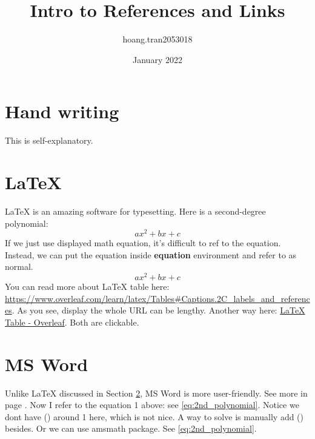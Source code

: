 \documentclass{article}
\title{Intro to References and Links}
\author{hoang.tran2053018 }
\date{January 2022}
\begin{document}
\maketitle
\section{Hand writing}
This is self-explanatory.

\section{LaTeX}\label{sec:latex-section} %
LaTeX is an amazing software for typesetting. Here is a second-degree polynomial: \[ax^{2}+bx+c\]
If we just use displayed math equation, it's difficult to ref to the equation. Instead, we can put the equation inside \textbf{equation} environment and refer to as normal.
\begin{equation}
\label{eq:2nd_polynomial} %
    ax^{2}+bx+c
\end{equation}
You can read more about LaTeX table here: \url{https://www.overleaf.com/learn/latex/Tables#Captions.2C_labels_and_references}. As you see, display the whole URL can be lengthy. Another way here: \href{https://www.overleaf.com/learn/latex/Tables#Captions.2C_labels_and_references}{LaTeX Table - Overleaf}. Both are clickable.

\newpage
\section{MS Word}
Unlike LaTeX discussed in Section \ref{sec:latex-section}, MS Word is more user-friendly. See more in page \pageref{sec:latex-section}. Now I refer to the equation 1 above: see \ref{eq:2nd_polynomial}. Notice we dont have () around 1 here, which is not nice. A way to solve is manually add () besides. Or we can use amsmath package. See \eqref{eq:2nd_polynomial}.
\end{document}

